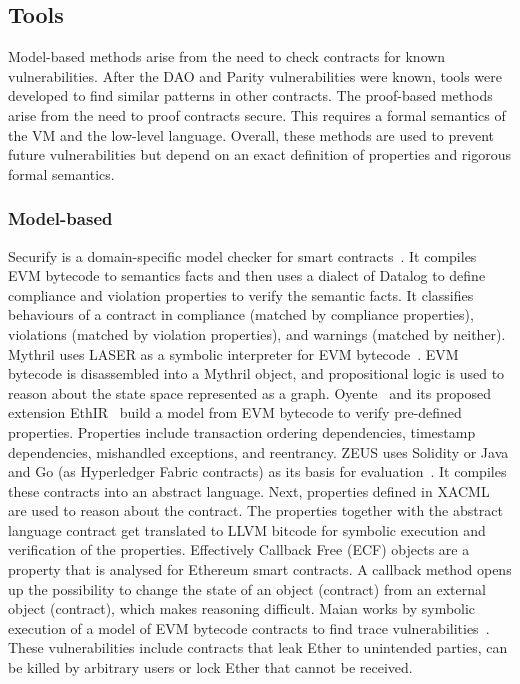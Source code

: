 


\subsection{Tools}
Model-based methods arise from the need to check contracts for known vulnerabilities. After the DAO and Parity vulnerabilities were known, tools were developed to find similar patterns in other contracts. The proof-based methods arise from the need to proof contracts secure. This requires a formal semantics of the VM and the low-level language. Overall, these methods are used to prevent future vulnerabilities but depend on an exact definition of properties and rigorous formal semantics.

\subsubsection{Model-based}
Securify is a domain-specific model checker for smart contracts~\cite{Tsankov2017}. It compiles EVM bytecode to semantics facts and then uses a dialect of Datalog to define compliance and violation properties to verify the semantic facts. It classifies behaviours of a contract in compliance (matched by compliance properties), violations (matched by violation properties), and warnings (matched by neither). 
Mythril uses LASER as a symbolic interpreter for EVM bytecode~\cite{Mueller2018}. EVM bytecode is disassembled into a Mythril object, and propositional logic is used to reason about the state space represented as a graph. 
Oyente~\cite{Luu2016} and its proposed extension EthIR~\cite{Albert2018} build a model from EVM bytecode to verify pre-defined properties. Properties include transaction ordering dependencies, timestamp dependencies, mishandled exceptions, and reentrancy.
ZEUS uses Solidity or Java and Go (as Hyperledger Fabric contracts) as its basis for evaluation~\cite{Kalra2018}. It compiles these contracts into an abstract language. Next, properties defined in XACML are used to reason about the contract. The properties together with the abstract language contract get translated to LLVM bitcode for symbolic execution and verification of the properties.
Effectively Callback Free (ECF) objects are a property that is analysed for Ethereum smart contracts\cite{Grossman2017}. A callback method opens up the possibility to change the state of an object (contract) from an external object (contract), which makes reasoning difficult. 
Maian works by symbolic execution of a model of EVM bytecode contracts to find trace vulnerabilities~\cite{Nikolic2018}. These vulnerabilities include contracts that leak Ether to unintended parties, can be killed by arbitrary users or lock Ether that cannot be received.

